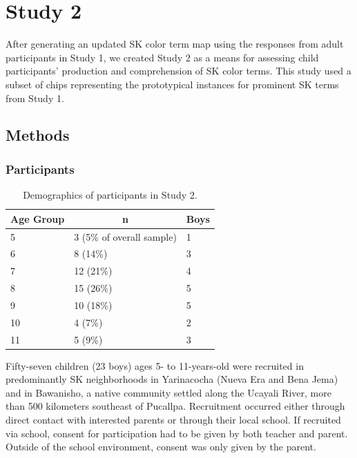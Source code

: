 \documentclass[
  english,
  ,man,floatsintext]{apa6}
\begin{document}
\hypertarget{study-2}{%
\section{Study 2}\label{study-2}}

After generating an updated SK color term map using the responses from adult participants in Study 1, we created Study 2 as a means for assessing child participants' production and comprehension of SK color terms. This study used a subset of chips representing the prototypical instances for prominent SK terms from Study 1.

\hypertarget{methods-1}{%
\subsection{Methods}\label{methods-1}}

\hypertarget{participants-1}{%
\subsubsection{Participants}\label{participants-1}}

\begin{table}[tbp]

\begin{center}
\begin{threeparttable}

\caption{\label{tab:unnamed-chunk-2}Demographics of participants in Study 2.}

\begin{tabular}{lll}
\toprule
Age Group & \multicolumn{1}{c}{n} & \multicolumn{1}{c}{Boys}\\
\midrule
5 & 3 (5\% of overall sample) & 1\\
6 & 8 (14\%) & 3\\
7 & 12 (21\%) & 4\\
8 & 15 (26\%) & 5\\
9 & 10 (18\%) & 5\\
10 & 4 (7\%) & 2\\
11 & 5 (9\%) & 3\\
\bottomrule
\end{tabular}

\end{threeparttable}
\end{center}

\end{table}

Fifty-seven children (23 boys) ages 5- to 11-years-old were recruited in predominantly SK neighborhoods in Yarinacocha (Nueva Era and Bena Jema) and in Bawanisho, a native community settled along the Ucayali River, more than 500 kilometers southeast of Pucallpa. Recruitment occurred either through direct contact with interested parents or through their local school. If recruited via school, consent for participation had to be given by both teacher and parent. Outside of the school environment, consent was only given by the parent.
\end{document}
